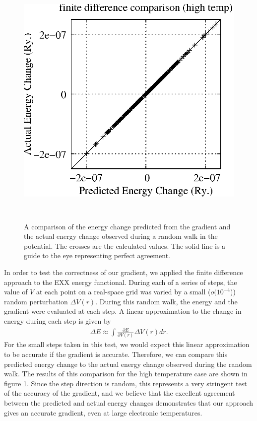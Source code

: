 \documentclass[12pt]{iopart}
\newcommand{\bea}{\begin{eqnarray}} \newcommand{\ena}{\end{eqnarray}}
\newcommand{\Vscp}{V}
\begin{document}
\begin{figure}
\centerline{
\includegraphics[height=5in]{finite_diff_high.eps}
}
\caption{A comparison of the energy change predicted from the gradient
and the actual energy change observed during a random walk in the
potential.  The crosses are the calculated values.  The solid
line is a guide to the eye representing perfect agreement.}
\label{fd_test}
\end{figure}

In order to test the correctness of our gradient, we applied the finite difference approach to
the EXX energy functional.
During each of a series of steps, the value of $\Vscp$ at each point on a real-space grid was
varied by a small ($o(10^{-4}$)) random perturbation $\Delta V(r)$.  During this random walk, the
energy and the gradient were evaluated at each step.  A linear approximation to the change
in energy during each step is given by
\bea
  \Delta E \approx \int{\frac{\partial E}{\partial V(r)} \Delta V(r) dr}.
\ena
For the small steps taken in this test, we would expect this linear approximation to be accurate if
the gradient is accurate.  Therefore, we can compare this predicted energy change to the actual
energy change observed during the random walk.  The results of this comparison for the high
temperature case are shown in figure \ref{fd_test}.  Since the step direction is random,
this represents a very stringent test of the accuracy of the gradient, and we believe that
the excellent agreement between the predicted and actual energy changes demonstrates
that our approach gives an accurate gradient, even at large electronic temperatures.
\end{document}
